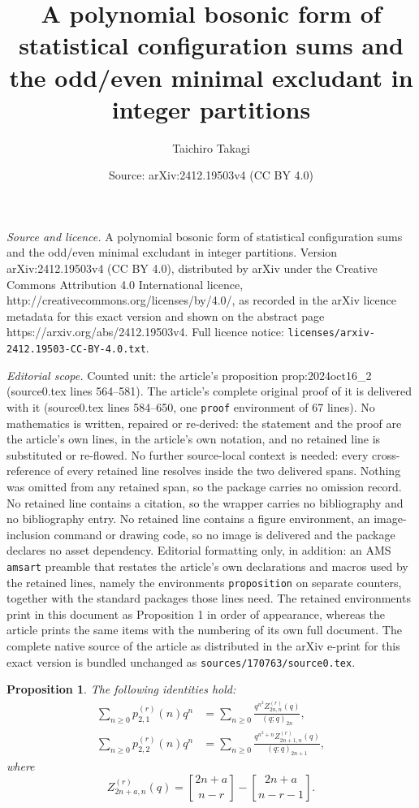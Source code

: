 \documentclass[10pt,a4paper]{amsart}
\title{A polynomial bosonic form of statistical configuration sums and the odd/even minimal excludant in integer partitions}
\author{Taichiro Takagi}
\date{Source: arXiv:2412.19503v4 (CC BY 4.0)}
\newtheorem{proposition}{Proposition}
\begin{document}
\maketitle

\noindent\emph{Source and licence.} A polynomial bosonic form of statistical configuration sums and the odd/even minimal excludant in integer partitions. Version arXiv:2412.19503v4 (CC BY 4.0), distributed by arXiv under the Creative Commons Attribution 4.0 International licence, http://creativecommons.org/licenses/by/4.0/, as recorded in the arXiv licence metadata for this exact version and shown on the abstract page https://arxiv.org/abs/2412.19503v4. Full licence notice: \texttt{licenses/arxiv-2412.19503-CC-BY-4.0.txt}.\par\smallskip

\noindent\textit{Editorial scope.} Counted unit: the article's proposition prop:2024oct16\_2 (source0.tex lines 564--581). The article's complete original proof of it is delivered with it (source0.tex lines 584--650, one \texttt{proof} environment of 67 lines). No mathematics is written, repaired or re-derived: the statement and the proof are the article's own lines, in the article's own notation, and no retained line is substituted or re-flowed.  No further source-local context is needed: every cross-reference of every retained line resolves inside the two delivered spans.  Nothing was omitted from any retained span, so the package carries no omission record.  No retained line contains a citation, so the wrapper carries no bibliography and no bibliography entry.  No retained line contains a figure environment, an image-inclusion command or drawing code, so no image is delivered and the package declares no asset dependency.  Editorial formatting only, in addition: an AMS \texttt{amsart} preamble that restates the article's own declarations and macros used by the retained lines, namely the environments \texttt{proposition} on separate counters, together with the standard packages those lines need.  The retained environments print in this document as Proposition 1 in order of appearance, whereas the article prints the same items with the numbering of its own full document.  The complete native source of the article as distributed in the arXiv e-print for this exact version is bundled unchanged as \texttt{sources/170763/source0.tex}.
\begin{proposition}\label{prop:2024oct16_2}
The following identities hold:
\begin{align}
\sum_{n \geq 0} p^{(r)}_{2,1}(n) q^n
&=  \sum_{n \geq 0} \frac{q^{n^2} Z_{2n,n}^{(r)}(q)}{(q;q)_{2n}}, \label{eq:2024nov21_1} \\
\sum_{n \geq 0} p^{(r)}_{2,2}(n) q^n 
&=  \sum_{n \geq 0} \frac{q^{n^2+n} Z_{2n+1,n}^{(r)}(q)}{(q;q)_{2n+1}},\label{eq:2024nov21_2}
\end{align}
where
\begin{equation}\label{eq:2024nov22_1}
Z_{2n+a,n}^{(r)}(q) =
{2n+a \brack n-r}
-
{2n+a \brack n-r-1}.
\end{equation}
\end{proposition}
\end{document}

